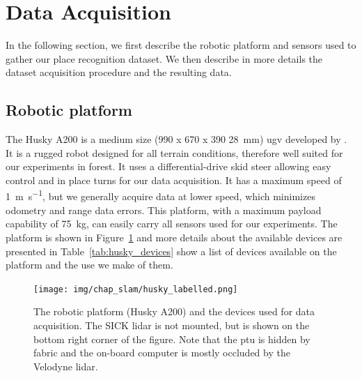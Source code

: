 \section{Data Acquisition}
\label{sec:chap_slam_data_acquisition}

In the following section, we first describe the robotic platform and sensors used to gather our place recognition dataset. We then describe in more details the dataset acquisition procedure and the resulting data.


\subsection{Robotic platform}
\label{ssec:chap_slam_platform}

The Husky A200 is a medium size (990 x 670 x 390 \SI{28}{\milli\meter}) \gls*{ugv} developed by \cite{ClearpathWeb}. It is a rugged robot designed for all terrain conditions, therefore well suited for our experiments in forest. It uses a differential-drive skid steer allowing easy control and in place turns for our data acquisition. It has a maximum speed of \SI{1}{\meter\per\second}, but we generally acquire data at lower speed, which minimizes odometry and range data errors. This platform, with a maximum payload capability of \SI{75}{\kilo\gram}, can easily carry all sensors used for our experiments. The platform is shown in Figure~\ref{fig:chap_slam_husky} and more details about the available devices are presented in Table~\ref{tab:husky_devices} show a list of devices available on the platform and the use we make of them.

\begin{figure}[H]
    \centering
    \texttt{[image: img/chap\_slam/husky\_labelled.png]}
    \caption{The robotic platform (Husky A200) and the devices used for data acquisition. The SICK \gls*{lidar} is not mounted, but is shown on the bottom right corner of the figure. Note that the \gls*{ptu} is hidden by fabric and the on-board computer is mostly occluded by the Velodyne \gls*{lidar}.}
    \label{fig:chap_slam_husky}
\end{figure}

